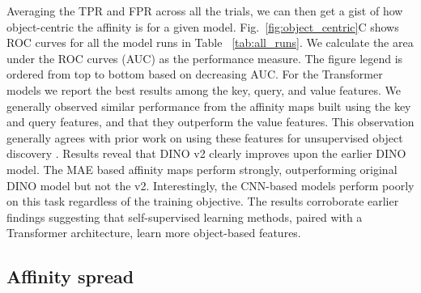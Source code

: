 \documentclass{article}
\begin{document}
Averaging the TPR and FPR across all the trials, we can then get a gist of how object-centric the affinity is for a given model. Fig.~\ref{fig:object_centric}C shows ROC curves for all the model runs in Table ~\ref{tab:all_runs}. We calculate the area under the ROC curves (AUC) as the performance measure. The figure legend is ordered from top to bottom based on decreasing AUC. For the Transformer models we report the best results among the key, query, and value features. We generally observed similar performance from the affinity maps built using the key and query features, and that they outperform the value features. This observation generally agrees with prior work on using these features for unsupervised object discovery \citep{simeoni2021localizing, wang2022self}. Results reveal that DINO v2 clearly improves upon the earlier DINO model. The MAE based affinity maps perform strongly, outperforming original DINO model but not the v2. Interestingly, the CNN-based models perform poorly on this task regardless of the training objective. The results corroborate earlier findings suggesting that self-supervised learning methods, paired with a Transformer architecture, learn more object-based features.


\subsection{Affinity spread}




\end{document}
